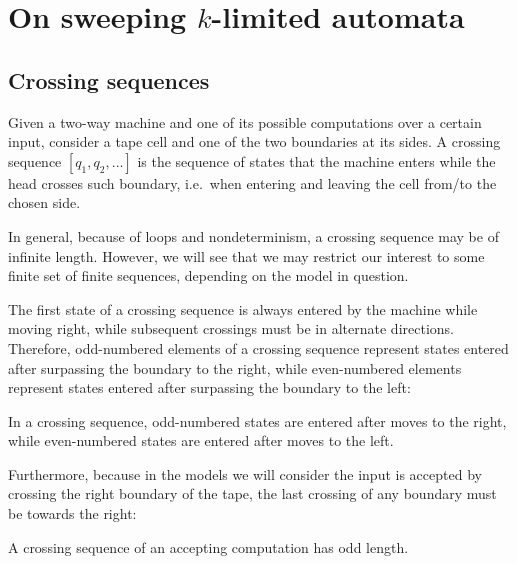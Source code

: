 \chapter{On sweeping \texorpdfstring{$k$-limited}{k-limited} automata}






\section{Crossing sequences}
Given a two-way machine and one of its possible computations over a certain input, consider a tape cell and one of the two boundaries at its sides.
A crossing sequence $[q_1,q_2,\dots]$ is the sequence of states that the machine enters while the head crosses such boundary, i.e.\ when entering and leaving the cell from/to the chosen side.

In general, because of loops and nondeterminism, a crossing sequence may be of infinite length.
However, we will see that we may restrict our interest to some finite set of finite sequences, depending on the model in question.

The first state of a crossing sequence is always entered by the machine while moving right, while subsequent crossings must be in alternate directions.
Therefore, odd-numbered elements of a crossing sequence represent states entered after surpassing the boundary to the right, while even-numbered elements represent states entered after surpassing the boundary to the left:
\begin{fact}\label{fact:crossing-parity}
	In a crossing sequence, odd-numbered states are entered after moves to the right, while even-numbered states are entered after moves to the left.
\end{fact}

Furthermore, because in the models we will consider the input is accepted by crossing the right boundary of the tape, the last crossing of any boundary must be towards the right:
\begin{fact}\label{fact:crossing-length}
	A crossing sequence of an accepting computation has odd length.
\end{fact}


